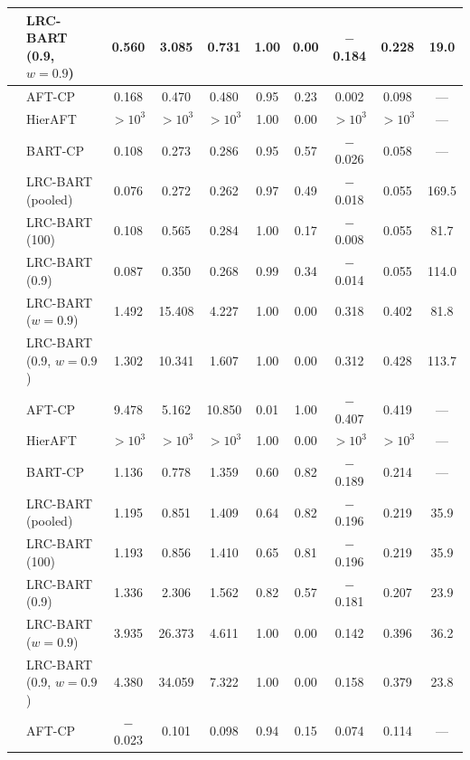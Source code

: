 \documentclass[11pt]{article}
\theoremstyle{definition}
\theoremstyle{plain}
\begin{document}
\begin{center}
\begin{longtable}{llcccccccc}
& LRC-BART (0.9, $w=0.9$) & 0.560 & 3.085 & 0.731 & 1.00 & 0.00 & $-$0.184 & 0.228 & 19.0 \\
\midrule
{} & AFT-CP & 0.168 & 0.470 & 0.480 & 0.95 & 0.23 & 0.002 & 0.098 & --- \\
& HierAFT & $>\!10^{3}$ & $>\!10^{3}$ & $>\!10^{3}$ & 1.00 & 0.00 & $>\!10^{3}$ & $>\!10^{3}$ & --- \\
& BART-CP & 0.108 & 0.273 & 0.286 & 0.95 & 0.57 & $-$0.026 & 0.058 & --- \\
& LRC-BART (pooled) & 0.076 & 0.272 & 0.262 & 0.97 & 0.49 & $-$0.018 & 0.055 & 169.5 \\
& LRC-BART (100) & 0.108 & 0.565 & 0.284 & 1.00 & 0.17 & $-$0.008 & 0.055 & 81.7 \\
& LRC-BART (0.9) & 0.087 & 0.350 & 0.268 & 0.99 & 0.34 & $-$0.014 & 0.055 & 114.0 \\
& LRC-BART ($w=0.9$) & 1.492 & 15.408 & 4.227 & 1.00 & 0.00 & 0.318 & 0.402 & 81.8 \\
& LRC-BART (0.9, $w=0.9$) & 1.302 & 10.341 & 1.607 & 1.00 & 0.00 & 0.312 & 0.428 & 113.7 \\
\midrule
{} & AFT-CP & 9.478 & 5.162 & 10.850 & 0.01 & 1.00 & $-$0.407 & 0.419 & --- \\
& HierAFT & $>\!10^{3}$ & $>\!10^{3}$ & $>\!10^{3}$ & 1.00 & 0.00 & $>\!10^{3}$ & $>\!10^{3}$ & --- \\
& BART-CP & 1.136 & 0.778 & 1.359 & 0.60 & 0.82 & $-$0.189 & 0.214 & --- \\
& LRC-BART (pooled) & 1.195 & 0.851 & 1.409 & 0.64 & 0.82 & $-$0.196 & 0.219 & 35.9 \\
& LRC-BART (100) & 1.193 & 0.856 & 1.410 & 0.65 & 0.81 & $-$0.196 & 0.219 & 35.9 \\
& LRC-BART (0.9) & 1.336 & 2.306 & 1.562 & 0.82 & 0.57 & $-$0.181 & 0.207 & 23.9 \\
& LRC-BART ($w=0.9$) & 3.935 & 26.373 & 4.611 & 1.00 & 0.00 & 0.142 & 0.396 & 36.2 \\
& LRC-BART (0.9, $w=0.9$) & 4.380 & 34.059 & 7.322 & 1.00 & 0.00 & 0.158 & 0.379 & 23.8 \\
\midrule
{} & AFT-CP & $-$0.023 & 0.101 & 0.098 & 0.94 & 0.15 & 0.074 & 0.114 & --- \\

\end{longtable}
\end{center}
\end{document}

